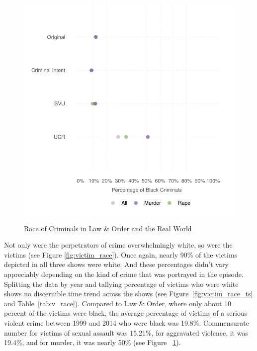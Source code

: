 \documentclass[12pt, letterpaper]{article}
\begin{document}
\begin{figure}[!htbp]
\centering
\caption{Race of Criminals in Law \& Order and the Real World}
\includegraphics[scale=.9]{../figs/all_criminals_by_race.pdf}
\label{fig:perp_race}
\end{figure}

Not only were the perpetrators of crime overwhelmingly white, so were the victims (see Figure \ref{fig:victim_race}). Once again, nearly 90\% of the victims depicted in all three shows were white. And these percentages didn't vary appreciably depending on the kind of crime that was portrayed in the episode. Splitting the data by year and tallying percentage of victims who were white shows no discernible time trend across the shows (see Figure~\ref{fig:victim_race_ts} and Table~\ref{tab:v_race}). Compared to Law \& Order, where only about 10 percent of the victims were black, the average percentage of victims of a serious violent crime between 1999 and 2014 who were black was 19.8\%. Commensurate number for victims of sexual assault was 15.21\%, for aggravated violence, it was 19.4\%, and for murder, it was nearly 50\% (see Figure ~\ref{fig:perp_race}).
\end{document}

